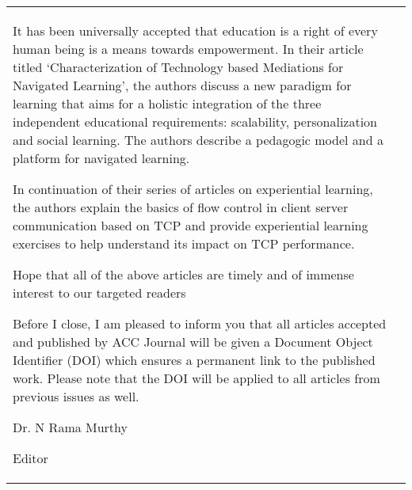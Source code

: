 {\begin{tabular}{p{.2\paperwidth}@{}!{\color{goldan-yellow}\vline width .9pt}p{.64\paperwidth}}
\bigskip

It has been universally accepted that education is a right of every human being is a means towards empowerment. In their article titled ‘Characterization of Technology based Mediations for Navigated Learning’, the authors discuss a new paradigm for learning that aims for a holistic integration of the three independent educational requirements: scalability, personalization and social learning. The authors describe a pedagogic model and a platform for navigated learning.  

\bigskip

In continuation of their series of articles on experiential learning, the authors explain the basics of flow control in client server communication based on TCP and provide experiential learning exercises to help understand its impact on TCP performance.

\bigskip

Hope that all of the above articles are timely and of immense interest to our targeted readers 

\bigskip

Before I close, I am pleased to inform you that all articles accepted and published by ACC Journal will be given a Document Object Identifier (DOI) which ensures a permanent link to the published work. Please note that the DOI will be applied to all articles from previous issues as well.

\bigskip

\hfill  Dr. N Rama Murthy\hspace{1cm}\,

\vskip 2pt

\hfill Editor\hspace{3.15cm}\,

\end{tabular}
}





